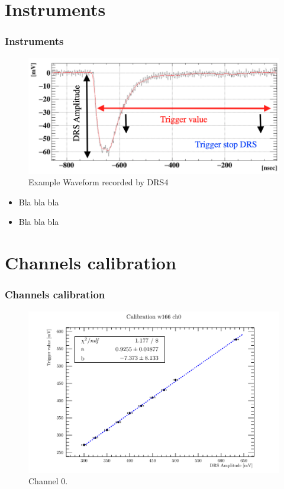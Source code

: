 \documentclass[9pt]{beamer}
\begin{document}
\section{Instruments}
\begin{frame} [fragile]
\small
	\frametitle{Instruments}
    		\begin{figure}
		 \centering
			\includegraphics[scale=0.3]{figures/instruments/Waveform_trigger.png}
			\caption{Example Waveform recorded by DRS4}
		\end{figure}  
	\begin{itemize}
		\item Bla bla bla
		\item Bla bla bla
	\end{itemize}
\end{frame}



\section{Channels calibration}
\begin{frame} [fragile]
\small
	\frametitle{Channels calibration}
    		\begin{figure}
		 \centering
			\includegraphics[scale=0.5]{figures/ch0.pdf}
			\caption{Channel 0.}
		\end{figure}  
\end{frame}
\end{document}

